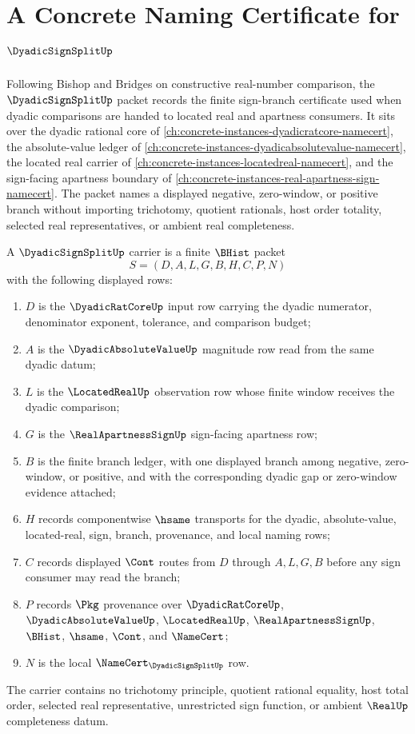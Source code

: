 \chapter{A Concrete Naming Certificate for $\DyadicSignSplitUp$}
\label{ch:concrete-instances-dyadic-sign-split-namecert}

Following Bishop and Bridges on constructive real-number comparison, the $\DyadicSignSplitUp$ packet records the finite sign-branch certificate used when dyadic comparisons are handed to located real and apartness consumers. It sits over the dyadic rational core of \autoref{ch:concrete-instances-dyadicratcore-namecert}, the absolute-value ledger of \autoref{ch:concrete-instances-dyadicabsolutevalue-namecert}, the located real carrier of \autoref{ch:concrete-instances-locatedreal-namecert}, and the sign-facing apartness boundary of \autoref{ch:concrete-instances-real-apartness-sign-namecert}. The packet names a displayed negative, zero-window, or positive branch without importing trichotomy, quotient rationals, host order totality, selected real representatives, or ambient real completeness.

\begin{definition}
\label{def:dyadic-sign-split-carrier}
A $\DyadicSignSplitUp$ carrier is a finite $\BHist$ packet
$$
S=(D,A,L,G,B,H,C,P,N)
$$
with the following displayed rows:
\begin{enumerate}
\item $D$ is the $\DyadicRatCoreUp$ input row carrying the dyadic numerator, denominator exponent, tolerance, and comparison budget;
\item $A$ is the $\DyadicAbsoluteValueUp$ magnitude row read from the same dyadic datum;
\item $L$ is the $\LocatedRealUp$ observation row whose finite window receives the dyadic comparison;
\item $G$ is the $\RealApartnessSignUp$ sign-facing apartness row;
\item $B$ is the finite branch ledger, with one displayed branch among negative, zero-window, or positive, and with the corresponding dyadic gap or zero-window evidence attached;
\item $H$ records componentwise $\hsame$ transports for the dyadic, absolute-value, located-real, sign, branch, provenance, and local naming rows;
\item $C$ records displayed $\Cont$ routes from $D$ through $A,L,G,B$ before any sign consumer may read the branch;
\item $P$ records $\Pkg$ provenance over $\DyadicRatCoreUp$, $\DyadicAbsoluteValueUp$, $\LocatedRealUp$, $\RealApartnessSignUp$, $\BHist$, $\hsame$, $\Cont$, and $\NameCert$;
\item $N$ is the local $\NameCert_{\DyadicSignSplitUp}$ row.
\end{enumerate}
The carrier contains no trichotomy principle, quotient rational equality, host total order, selected real representative, unrestricted sign function, or ambient $\RealUp$ completeness datum.
\end{definition}

